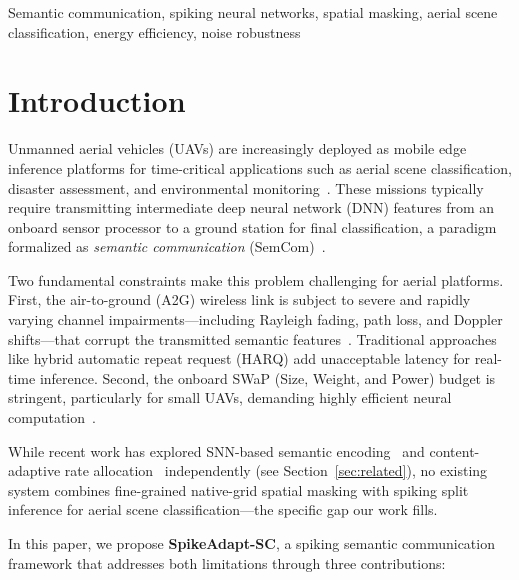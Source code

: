 \documentclass[conference]{IEEEtran}
\begin{document}
\begin{IEEEkeywords}
Semantic communication, spiking neural networks, spatial masking, aerial scene classification, energy efficiency, noise robustness
\end{IEEEkeywords}

\section{Introduction}
\label{sec:intro}

Unmanned aerial vehicles (UAVs) are increasingly deployed as mobile edge inference platforms for time-critical applications such as aerial scene classification, disaster assessment, and environmental monitoring~\cite{zeng2019uav, li2021survey}. These missions typically require transmitting intermediate deep neural network (DNN) features from an onboard sensor processor to a ground station for final classification, a paradigm formalized as \emph{semantic communication} (SemCom)~\cite{xie2021deep, bourtsoulatze2019deep}.

Two fundamental constraints make this problem challenging for aerial platforms. First, the air-to-ground (A2G) wireless link is subject to severe and rapidly varying channel impairments---including Rayleigh fading, path loss, and Doppler shifts---that corrupt the transmitted semantic features~\cite{khuwaja2018survey}. Traditional approaches like hybrid automatic repeat request (HARQ) add unacceptable latency for real-time inference. Second, the onboard SWaP (Size, Weight, and Power) budget is stringent, particularly for small UAVs, demanding highly efficient neural computation~\cite{li2021survey}.

While recent work has explored SNN-based semantic encoding~\cite{wang2024snnsc} and content-adaptive rate allocation~\cite{li2024djscc} independently (see Section~\ref{sec:related}), no existing system combines fine-grained native-grid spatial masking with spiking split inference for aerial scene classification---the specific gap our work fills.

In this paper, we propose \textbf{SpikeAdapt-SC}, a spiking semantic communication framework that addresses both limitations through three contributions:
\end{document}
